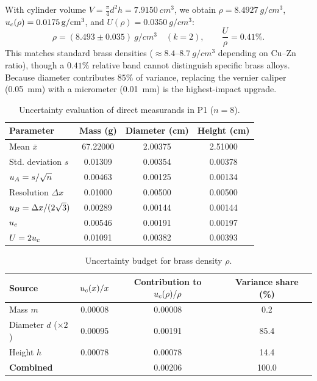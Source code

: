 \documentclass[a4paper, 12pt]{article}
\begin{document}
        With cylinder volume $V=\tfrac{\pi}{4}d^2h=\SI{7.9150}{cm^3}$, we obtain $\rho=\SI{8.4927}{g/cm^3}$, $u_{c}(\rho)=\SI{0.0175}{g/cm^3}$, and $U(\rho)=\SI{0.0350}{g/cm^3}$:
        \begin{equation}
            \boxed{\rho=(8.493\pm0.035)\ \si{g/cm^3}\quad(k=2),\qquad \frac{U}{\rho}=0.41\%.}
        \end{equation}
        This matches standard brass densities ($\approx 8.4\text{--}8.7\ \si{g/cm^3}$ depending on Cu--Zn ratio), though a $0.41\%$ relative band cannot distinguish specific brass alloys. Because diameter contributes $85\%$ of variance, replacing the vernier caliper (\SI{0.05}{mm}) with a micrometer (\SI{0.01}{mm}) is the highest-impact upgrade.
\begin{table}[H]
\centering
\singlespacing
\caption{Uncertainty evaluation of direct measurands in P1 ($n=8$).}
\label{tab:uP1}
\small
\begin{tabular}{l S[table-format=2.5] S[table-format=1.5] S[table-format=1.5]}
\toprule
\textbf{Parameter} & {Mass (g)} & {Diameter (cm)} & {Height (cm)}\\
\midrule
Mean $\bar{x}$ & 67.22000 & 2.00375 & 2.51000\\
Std. deviation $s$ & 0.01309 & 0.00354 & 0.00378\\
$u_{A}=s/\sqrt{n}$ & 0.00463 & 0.00125 & 0.00134\\
Resolution $\Delta x$ & 0.01000 & 0.00500 & 0.00500\\
$u_{B}=\Delta x/(2\sqrt{3})$ & 0.00289 & 0.00144 & 0.00144\\
$u_{c}$ & 0.00546 & 0.00191 & 0.00197\\
$U=2u_{c}$ & 0.01091 & 0.00382 & 0.00393\\
\bottomrule
\end{tabular}
\end{table}

\begin{table}[H]
\centering
\singlespacing
\caption{Uncertainty budget for brass density $\rho$.}
\label{tab:budget}
\small
\begin{tabular}{l S[table-format=1.5] S[table-format=1.5] S[table-format=3.1]}
\toprule
\textbf{Source} & {$u_{c}(x)/x$} & {Contribution to $u_{c}(\rho)/\rho$} & {Variance share (\%)}\\
\midrule
Mass $m$ & 0.00008 & 0.00008 & 0.2\\
Diameter $d$ ($\times2$) & 0.00095 & 0.00191 & 85.4\\
Height $h$ & 0.00078 & 0.00078 & 14.4\\
\midrule
\textbf{Combined} & & 0.00206 & 100.0\\
\bottomrule
\end{tabular}
\end{table}
\end{document}
